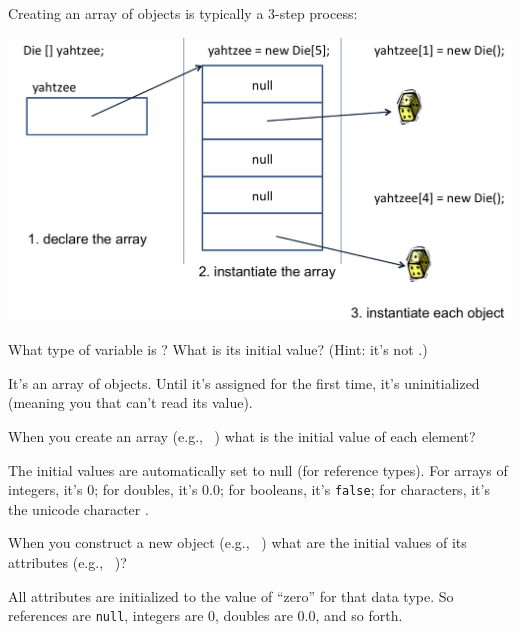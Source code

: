 
Creating an array of objects is typically a 3-step process:

\begin{center}
\includegraphics[width=5.5in]{CS1B/yahtzee-array.png}
\end{center}




\Q What type of variable is ?
What is its initial value? (Hint: it's not .)

\begin{answer}
It's an array of  objects. Until it's assigned for the first time, it's uninitialized (meaning you that can't read its value).
\end{answer}


\Q When you create an array (e.g., ~) what is the initial value of each element?

\begin{answer}
The initial values are automatically set to null (for reference types). For arrays of integers, it's 0; for doubles, it's 0.0; for booleans, it's {\tt false}; for characters, it's the unicode character .
\end{answer}


\Q When you construct a new object (e.g., ~) what are the initial values of its attributes (e.g., ~)?

\begin{answer}
All attributes are initialized to the value of ``zero'' for that data type.
So references are {\tt null}, integers are 0, doubles are 0.0, and so forth.
\end{answer}


